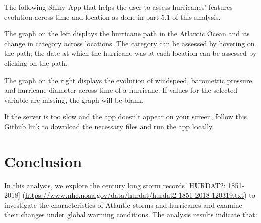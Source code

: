 \documentclass[]{book}
\begin{document}
The following Shiny App that helps the user to assess hurricanes' features evolution across time and location as done in part 5.1 of this analysis.

The graph on the left displays the hurricane path in the Atlantic Ocean and its change in category across locations. The category can be assessed by hovering on the path; the date at which the hurricane was at each location can be assessed by clicking on the path.

The graph on the right displays the evolution of windspeed, barometric pressure and hurricane diameter across time of a hurricane. If values for the selected variable are missing, the graph will be blank.

If the server is too slow and the app doesn't appear on your screen, follow this \href{https://github.com/jqz300/edav_proj}{Github link} to download the necessary files and run the app locally.

\hypertarget{conclusion}{%
\chapter{Conclusion}\label{conclusion}}

In this analysis, we explore the century long storm records {[}HURDAT2: 1851-2018{]} (\url{https://www.nhc.noaa.gov/data/hurdat/hurdat2-1851-2018-120319.txt}) to investigate the characteristics of Atlantic storms and hurricanes and examine their changes under global warming conditions. The analysis results indicate that:
\end{document}
